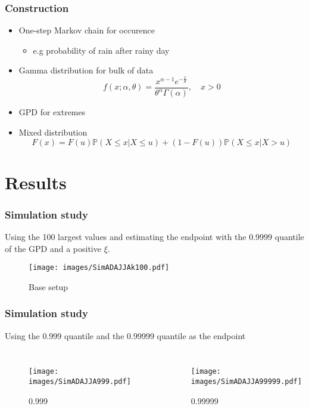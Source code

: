 \documentclass{beamer}
\begin{document}
\begin{frame}
\frametitle{Construction}
\begin{itemize}
	\item One-step Markov chain for occurence
	\begin{itemize}
		\item e.g  probability of rain after rainy day 
	\end{itemize}
	\item Gamma distribution for bulk of data
	\begin{equation*}
	f(x ; \alpha, \theta) = \frac{x^{\alpha-1} e^{-\frac{x}{\theta}}}{\theta^\alpha \Gamma(\alpha)}, \quad x > 0
	\end{equation*}
	\item GPD for extremes
	\item Mixed distribution 
	\begin{equation*}
	F(x)= F(u) \mathbb{P}(X \leq x | X \leq u) + (1-{F(u)}) \mathbb{P}(X \leq x | X > u)
	\end{equation*}
\end{itemize}	
\end{frame}

\section{Results}

\begin{frame}
\frametitle{Simulation study}
Using the 100 largest values and estimating the endpoint with the 0.9999 quantile of the GPD and a  positive $\xi$.
\begin{figure}
	\texttt{[image: images/SimADAJJAk100.pdf]}
	\caption{Base setup}
\end{figure}
\end{frame}

\begin{frame}
\frametitle{Simulation study}
Using the 0.999 quantile and the 0.99999 quantile as the endpoint
\begin{columns}
	\begin{figure}
		\texttt{[image: images/SimADAJJA999.pdf]}
		\caption{0.999}
	\end{figure}
	\begin{figure}
		\texttt{[image: images/SimADAJJA99999.pdf]}
		\caption{0.99999}
	\end{figure}
\end{columns}
\end{frame}
\end{document}
